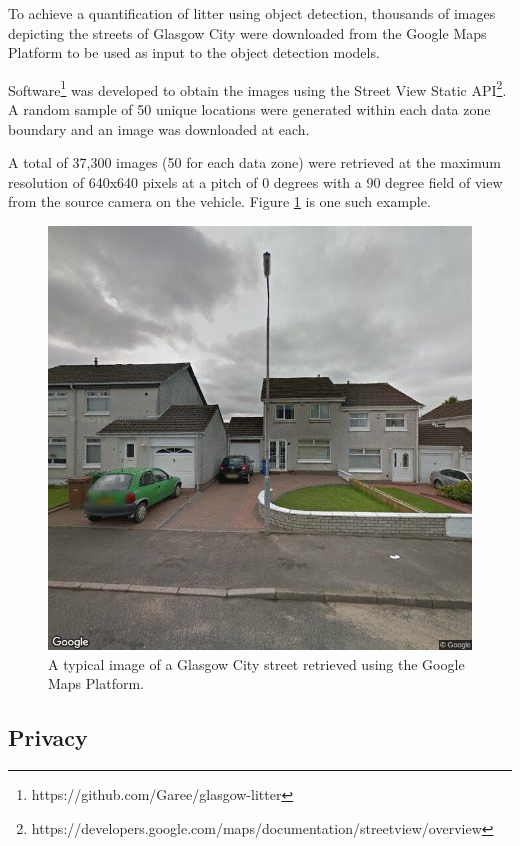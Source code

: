 \documentclass{thesis}
\begin{document}
To achieve a quantification of litter using object detection, thousands of images depicting the streets of Glasgow City were downloaded from the Google Maps Platform to be used as input to the  object detection models. 

Software\footnote{https://github.com/Garee/glasgow-litter} was developed to obtain the images using the Street View Static API\footnote{https://developers.google.com/maps/documentation/streetview/overview}. A random sample of 50 unique locations were generated within each data zone boundary and an image was downloaded at each.

A total of 37,300 images (50 for each data zone) were retrieved at the maximum resolution of 640x640 pixels at a pitch of 0 degrees with a 90 degree field of view from the source camera on the vehicle. Figure \ref{fig:street-view-image} is one such example.

\begin{figure}[h]
    \centering
    \includegraphics[scale=0.5]{images/street-view-image.jpg}
    \caption{A typical image of a Glasgow City street retrieved using the Google Maps Platform.}
    \label{fig:street-view-image}
\end{figure}

\subsection*{Privacy}
\end{document}
